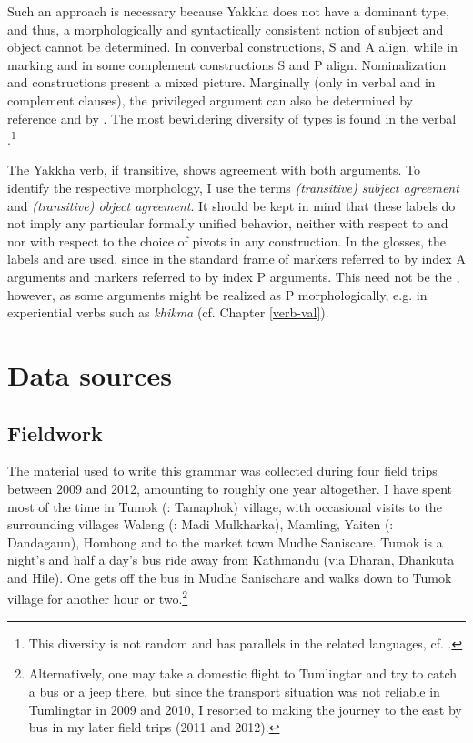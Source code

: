 Such an approach is necessary because Yakkha does not have a dominant  type, and thus, a morphologically and syntactically consistent notion of subject and object cannot be determined. In converbal constructions, S and A align, while in  marking and in some complement constructions S and P align. Nominalization and  constructions present a mixed picture. Marginally (only in verbal  and in complement clauses), the  privileged argument can also be determined by reference and by . The most bewildering diversity of  types is found in the verbal .\footnote{This diversity is not random and has parallels in the related languages, cf. .}   


The Yakkha verb, if transitive, shows agreement with both arguments. To identify the respective morphology, I use the terms \emph{(transitive) subject agreement}  and \emph{(transitive) object agreement}. It should be kept in mind that these labels do not imply any particular formally unified behavior, neither with respect to  and  nor with respect to the choice of pivots in any construction. In the glosses,  the labels  and  are used, since in the standard frame of  markers referred to by  index A arguments and markers referred to by  index P arguments. This need not be the , however, as some  arguments might be realized as P morphologically, e.g. in experiential verbs such as \emph{khikma}  (cf. Chapter \ref{verb-val}).


\section{Data sources}\label{sources}

\subsection{Fieldwork}

The material used to write this grammar was collected during four field trips between 2009 and 2012, amounting to roughly one year altogether. I have spent most of the time in Tumok (: Tamaphok) village, with occasional visits to the surrounding villages Waleng (: Madi Mulkharka), Mamling, Yaiten (:  Dandagaun), Hombong and to the market town Mudhe Saniscare. Tumok is a night's and half a day's bus ride away from Kathmandu (via Dharan, Dhankuta and Hile). One gets off the bus in  Mudhe Sanischare and walks down to Tumok village for another hour or two.\footnote{Alternatively, one may take a domestic flight to Tumlingtar and try to catch a bus or a jeep there, but since the transport situation was not reliable in Tumlingtar in 2009 and 2010, I resorted to making the journey to the east by bus in my later field trips (2011 and 2012).}



